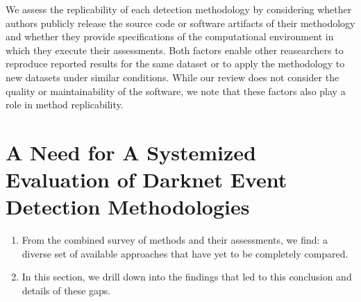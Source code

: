 \documentclass[manuscript,nonacm]{acmart}
\begin{document}

\vspace{0.25em}
We assess the replicability of each detection methodology by considering whether authors publicly release the source code or software artifacts of their methodology and whether they provide specifications of the computational environment in which they execute their assessments. 
Both factors enable other reasearchers to reproduce reported results for the same dataset or to apply the methodology to new datasets under similar conditions. 
While our review does not consider the quality or maintainability of the software, we note that these factors also play a role in method replicability.


\section{A Need for A Systemized Evaluation of Darknet Event Detection Methodologies}

\begin{enumerate}
    \item From the combined survey of methods and their assessments, we find: a diverse set of available approaches that have yet to be completely compared.
    \item In this section, we drill down into the findings that led to this conclusion and details of these gaps.
\end{enumerate}
\end{document}

